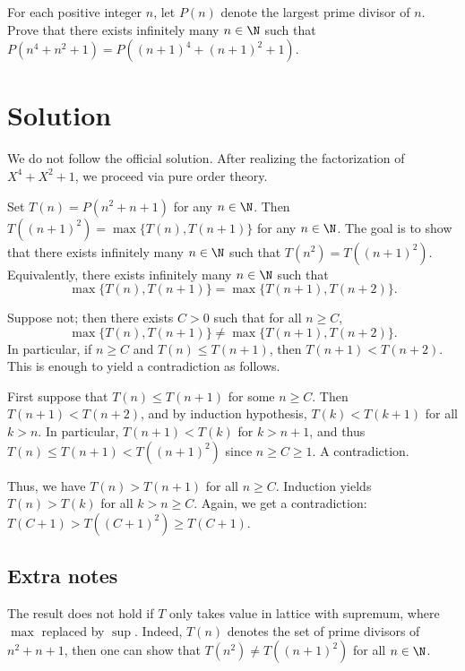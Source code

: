 For each positive integer $n$, let $P(n)$ denote the largest prime divisor of $n$.
Prove that there exists infinitely many $n \in \N$ such that $P(n^4 + n^2 + 1) = P((n + 1)^4 + (n + 1)^2 + 1)$.



\section*{Solution}

We do not follow the official solution.
After realizing the factorization of $X^4 + X^2 + 1$, we proceed via pure order theory.

Set $T(n) = P(n^2 + n + 1)$ for any $n \in \N$.
Then $T((n + 1)^2) = \max\{T(n), T(n + 1)\}$ for any $n \in \N$.
The goal is to show that there exists infinitely many $n \in \N$ such that $T(n^2) = T((n + 1)^2)$.
Equivalently, there exists infinitely many $n \in \N$ such that
\[ \max\{T(n), T(n + 1)\} = \max\{T(n + 1), T(n + 2)\}. \]

Suppose not; then there exists $C > 0$ such that for all $n \geq C$,
\[ \max\{T(n), T(n + 1)\} \neq \max\{T(n + 1), T(n + 2)\}. \]
In particular, if $n \geq C$ and $T(n) \leq T(n + 1)$, then $T(n + 1) < T(n + 2)$.
This is enough to yield a contradiction as follows.

First suppose that $T(n) \leq T(n + 1)$ for some $n \geq C$.
Then $T(n + 1) < T(n + 2)$, and by induction hypothesis, $T(k) < T(k + 1)$ for all $k > n$.
In particular, $T(n + 1) < T(k)$ for $k > n + 1$, and thus $T(n) \leq T(n + 1) < T((n + 1)^2)$ since $n \geq C \geq 1$.
A contradiction.

Thus, we have $T(n) > T(n + 1)$ for all $n \geq C$.
Induction yields $T(n) > T(k)$ for all $k > n \geq C$.
Again, we get a contradiction: $T(C + 1) > T((C + 1)^2) \geq T(C + 1)$.



\subsection*{Extra notes}

The result does not hold if $T$ only takes value in lattice with supremum, where $\max$ replaced by $\sup$.
Indeed, $T(n)$ denotes the set of prime divisors of $n^2 + n + 1$, then one can show that $T(n^2) \neq T((n + 1)^2)$ for all $n \in \N$.
